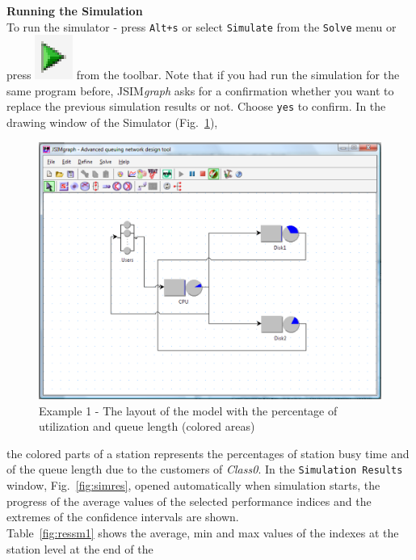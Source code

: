 \noindent \textbf{Running the Simulation}\\
To run the simulator - press \texttt{Alt+s} or select
\texttt{Simulate} from the \texttt{Solve} menu or press
\includegraphics[scale=.5]{img/jsimg/play} from the toolbar.
Note that if you had run the simulation for the same program
before, JSIM\emph{graph} asks for a confirmation whether you want
to replace the previous simulation results or not. Choose
\texttt{yes} to confirm. In the drawing window of the Simulator
(Fig.~\ref{fig:progsimw}),
\begin{figure}[htb]
    \begin{center}
        \includegraphics[scale=.5]{img/jsimg/12.14.eps}
    \end{center}
    \caption{Example 1 - The layout of the model with the percentage of
    utilization and queue length (colored areas)}
    \label{fig:progsimw}
\end{figure}
the colored parts of a station represents the percentages of
station busy time and of the queue length due to the customers of
\emph{Class0}. In the \texttt{Simulation Results} window,
Fig.~\ref{fig:simres},  opened automatically when simulation
starts, the progress of the average values of the selected
performance indices and the extremes of the confidence intervals
are shown.\\ Table~\ref{fig:ressm1} shows the average, min and max
values of the indexes at the station level at the end of the
